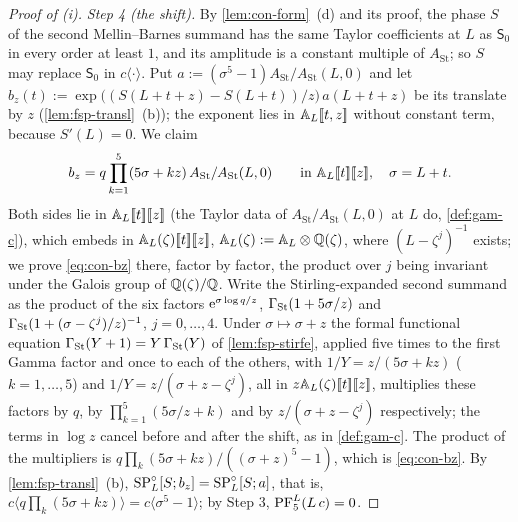 \begin{proof}[Proof of (i)]
\emph{Step 4 (the shift).} By \cref{lem:con-form}~(d) and its proof, the phase $S$ of the second Mellin--Barnes summand has the same Taylor coefficients at $L$ as $\mathsf S_0$ in every order at least $1$, and its amplitude is a constant multiple of $A_{\mathrm{St}}$; so $S$ may replace $\mathsf S_0$ in $c\langle\cdot\rangle$. Put $a:=(\sigma^5-1)A_{\mathrm{St}}/A_{\mathrm{St}}(L,0)$ and let $b_z(t):=\exp\bigl((S(L+t+z)-S(L+t))/z\bigr)\,a(L+t+z)$ be its translate by $z$ (\cref{lem:fsp-transl}~(b)); the exponent lies in $\mathbb{A}_{L}[\![ t,z ]\!]$ without constant term, because $S'(L)=0$. We claim
\begin{equation}
\label{eq:con-bz}
b_z=q\prod_{k=1}^5(5\sigma+kz)\,A_{\mathrm{St}}/A_{\mathrm{St}}(L,0)\qquad\text{in }\mathbb{A}_{L}[\![ t ]\!][\![ z ]\!],\quad\sigma=L+t .
\end{equation}
Both sides lie in $\mathbb{A}_{L}[\![ t ]\!][\![ z ]\!]$ (the Taylor data of $A_{\mathrm{St}}/A_{\mathrm{St}}(L,0)$ at $L$ do, \cref{def:gam-c}), which embeds in $\mathbb{A}_{L}(\zeta)[\![ t ]\!][\![ z ]\!]$, $\mathbb{A}_{L}(\zeta):=\mathbb{A}_{L}\otimes\mathbb{Q}(\zeta)$, where $(L-\zeta^j)^{-1}$ exists; we prove \eqref{eq:con-bz} there, factor by factor, the product over $j$ being invariant under the Galois group of $\mathbb{Q}(\zeta)/\mathbb{Q}$. Write the Stirling-expanded second summand as the product of the six factors $\mathrm{e}^{\sigma\log q/z}$, $\Gamma_{\mathrm{St}}(1+5\sigma/z)$ and $\Gamma_{\mathrm{St}}(1+(\sigma-\zeta^j)/z)^{-1}$, $j=0,\dots,4$. Under $\sigma\mapsto\sigma+z$ the formal functional equation $\Gamma_{\mathrm{St}}(Y+1)=Y\,\Gamma_{\mathrm{St}}(Y)$ of \cref{lem:fsp-stirfe}, applied five times to the first Gamma factor and once to each of the others, with $1/Y=z/(5\sigma+kz)$ ($k=1,\dots,5$) and $1/Y=z/(\sigma+z-\zeta^j)$, all in $z\mathbb{A}_{L}(\zeta)[\![ t ]\!][\![ z ]\!]$, multiplies these factors by $q$, by $\prod_{k=1}^5(5\sigma/z+k)$ and by $z/(\sigma+z-\zeta^j)$ respectively; the terms in $\log z$ cancel before and after the shift, as in \cref{def:gam-c}. The product of the multipliers is $q\prod_k(5\sigma+kz)/((\sigma+z)^5-1)$, which is \eqref{eq:con-bz}. By \cref{lem:fsp-transl}~(b), $\mathrm{SP}^{\circ}_L[S;b_z]=\mathrm{SP}^{\circ}_L[S;a]$, that is, $c\langle q\prod_k(5\sigma+kz)\rangle=c\langle\sigma^5-1\rangle$; by Step 3, $\mathrm{PF}_{5}^{L}(L\,c)=0$.
\end{proof}


